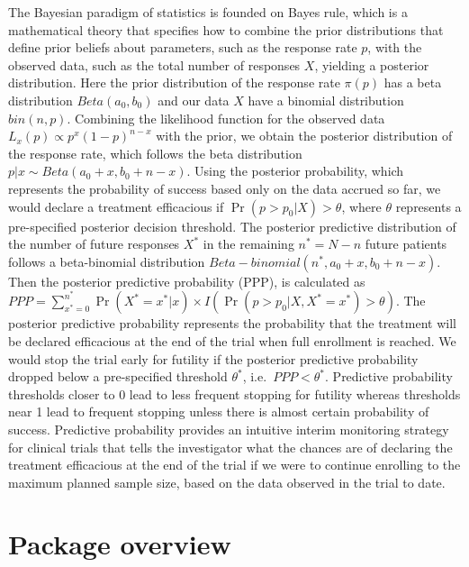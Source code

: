 The Bayesian paradigm of statistics is founded on Bayes rule, which is a
mathematical theory that specifies how to combine the prior
distributions that define prior beliefs about parameters, such as the
response rate \(p\), with the observed data, such as the total number of
responses \(X\), yielding a posterior distribution. Here the prior
distribution of the response rate \(\pi(p)\) has a beta distribution
\(Beta(a_0, b_0)\) and our data \(X\) have a binomial distribution
\(bin(n, p)\). Combining the likelihood function for the observed data
\(L_x(p) \propto p^x (1-p)^{n-x}\) with the prior, we obtain the
posterior distribution of the response rate, which follows the beta
distribution \(p|x \sim Beta(a_0 + x, b_0 + n - x)\). Using the
posterior probability, which represents the probability of success based
only on the data accrued so far, we would declare a treatment
efficacious if \(\Pr(p>p_0 | X) > \theta\), where \(\theta\) represents
a pre-specified posterior decision threshold. The posterior predictive
distribution of the number of future responses \(X^*\) in the remaining
\(n^*=N-n\) future patients follows a beta-binomial distribution
\(Beta-binomial(n^*, a_0 + x, b_0 + n - x)\). Then the posterior
predictive probability (PPP), is calculated as
\(PPP = \sum_{{x^*}=0}^{n^*} \Pr(X^*=x^*|x) \times I(\Pr(p>p_0 | X, X^*=x^*) > \theta)\).
The posterior predictive probability represents the probability that the
treatment will be declared efficacious at the end of the trial when full
enrollment is reached. We would stop the trial early for futility if the
posterior predictive probability dropped below a pre-specified threshold
\(\theta^*\), i.e.~\(PPP<\theta^*\). Predictive probability thresholds
closer to 0 lead to less frequent stopping for futility whereas
thresholds near 1 lead to frequent stopping unless there is almost
certain probability of success. Predictive probability provides an
intuitive interim monitoring strategy for clinical trials that tells the
investigator what the chances are of declaring the treatment efficacious
at the end of the trial if we were to continue enrolling to the maximum
planned sample size, based on the data observed in the trial to date.

\hypertarget{package-overview}{%
\section{Package overview}\label{package-overview}}

